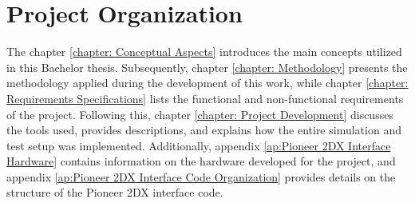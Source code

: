 \documentclass[../../monografia.tex]{subfiles}
\begin{document}
\section{Project Organization}

The chapter \ref{chapter: Conceptual Aspects} introduces the main concepts utilized in this Bachelor thesis. Subsequently, chapter \ref{chapter: Methodology} presents the methodology applied during the development of this work, while chapter \ref{chapter: Requirements Specifications} lists the functional and non-functional requirements of the project. Following this, chapter \ref{chapter: Project Development} discusses the tools used, provides descriptions, and explains how the entire simulation and test setup was implemented. Additionally, appendix \ref{ap:Pioneer 2DX Interface Hardware} contains information on the hardware developed for the project, and appendix \ref{ap:Pioneer 2DX Interface Code Organization} provides details on the structure of the Pioneer 2DX interface code.
\end{document}
